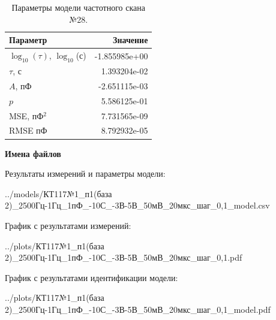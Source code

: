\begin{table}[!ht]
    \centering
    \caption{Параметры модели частотного скана №28.}
    \begin{tabular}{|l|r|}
        \hline
        Параметр                                       & Значение                  \\ \hline
        $\log_{10}(\tau)$, $\log_{10}$(с)              & -1.855985e+00             \\ \hline
        $\tau$, с                                      & 1.393204e-02              \\ \hline
        $A$, пФ                                        & -2.651115e-03             \\ \hline
        $p$                                            & 5.586125e-01              \\ \hline
        MSE, пФ$^2$                                    & 7.731565e-09              \\ \hline
        RMSE пФ                                        & 8.792932e-05              \\ \hline
    \end{tabular}
    \label{table:frequency_scan_model_28}
\end{table}

\textbf{Имена файлов}

Результаты измерений и параметры модели:

\scriptsize../models/КТ117№1\_п1(база 2)\_2500Гц-1Гц\_1пФ\_-10С\_-3В-5В\_50мВ\_20мкс\_шаг\_0,1\_model.csv
\normalsize

График с результатами измерений:

\scriptsize../plots/КТ117№1\_п1(база 2)\_2500Гц-1Гц\_1пФ\_-10С\_-3В-5В\_50мВ\_20мкс\_шаг\_0,1.pdf
\normalsize

График с результатами идентификации модели:

\scriptsize../plots/КТ117№1\_п1(база 2)\_2500Гц-1Гц\_1пФ\_-10С\_-3В-5В\_50мВ\_20мкс\_шаг\_0,1\_model.pdf
\normalsize


